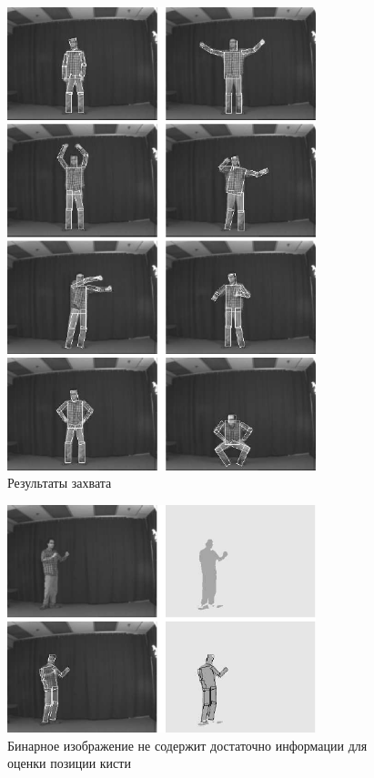 \begin{figure}
  \centering
  \includegraphics[width=0.8\textwidth]{images/detection-matching-results.png}
  \caption{Результаты захвата\label{detection-matching-results}}
\end{figure}

\begin{figure}
  \centering
  \includegraphics[width=0.8\textwidth]{images/detection-not-enough-info.png}
  \caption{Бинарное изображение не содержит достаточно информации для оценки позиции кисти\label{detection-not-enough-info}}
\end{figure}

